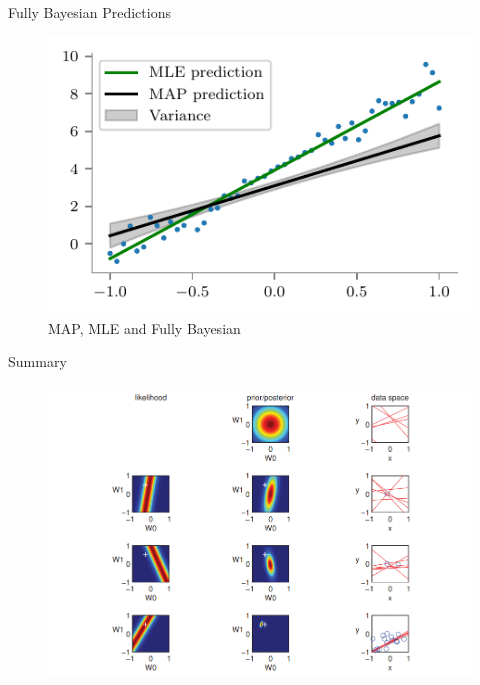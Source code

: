\documentclass{beamer}
\begin{document}
\begin{frame}{Fully Bayesian Predictions}
\begin{figure}
	\centering
	\includegraphics{../../notebooks/bayesian-linear-full}
	\caption{MAP, MLE and Fully Bayesian}
	\label{fig:bayesian-linear-dataset}
\end{figure}

\end{frame}

\begin{frame}{Summary}
\begin{figure}
	\centering
	\includegraphics[scale=0.33]{../../notebooks/murphy}
	\label{fig:murphy}
\end{figure}

\end{frame}
\end{document}
